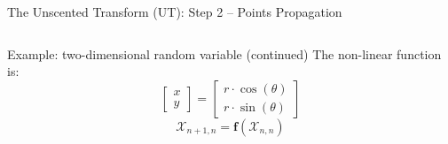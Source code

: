 \begin{frame}{The Unscented Transform (UT): Step 2 – Points Propagation}



\begin{columns}
Example: two-dimensional random variable (continued)
The non-linear function is:
\[
\begin{bmatrix}
x \\
y
\end{bmatrix}
=
\begin{bmatrix}
r \cdot \cos(\theta) \\
r \cdot \sin(\theta)
\end{bmatrix}
\]
\[
\mathbf{\mathcal{X}}_{n+1,n} = \mathbf{f}(\mathbf{\mathcal{X}}_{n,n})
\]


\end{columns}
\end{frame}

